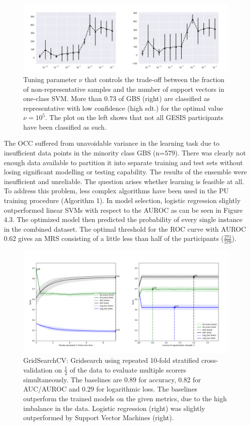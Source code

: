 \begin{figure}[ht]
\centering
   \includegraphics[scale=0.38,angle=0]{fig/occfigure}
\captionsetup{width= 380pt}
\caption{Tuning parameter \(\nu\) that controls the trade-off between the fraction of non-representative samples and the number of support vectors in one-class SVM. More than 0.73 of GBS (right) are classified as representative with low confidence (high sdt.) for the optimal value \( \nu = 10^5\). The plot on the left shows that not all GESIS participants have been classified as such.} 
\end{figure}

The OCC suffered from unavoidable variance in the learning task due to insufficient data points in the minority class GBS (n=579). There was clearly not enough data available to partition it into separate training and test sets without losing significant modelling or testing capability. The results of the ensemble were insufficient and unreliable. The question arises whether learning is feasible at all. To address this problem, less complex algorithms have been used in the PU training procedure (Algorithm 1). In model selection, logistic regression slightly outperformed linear SVMs with respect to the AUROC as can be seen in Figure 4.3. The optimized model then predicted the probability of every single instance in the combined dataset. The optimal threshold for the ROC curve with AUROC 0.62 gives an MRS consisting of a little less than half of the participants (\(\frac{271}{579}\)).

\begin{figure}[ht]
\centering
   \includegraphics[scale=0.38,angle=0]{fig/gridfigure}
\captionsetup{width= 400pt}
\caption{GridSearchCV: Gridsearch using repeated 10-fold stratified cross-validation on \(\frac{1}{2}\) of the data to evaluate multiple scorers simultaneously. The baselines are 0.89 for accuracy, 0.82 for AUC/AUROC and 0.29 for logarithmic loss. The baselines outperform the trained models on the given metrics, due to the high imbalance in the data. Logistic regression (right) was slightly outperformed by Support Vector Machines (right).}
   \label{fig:Ng1} 
\end{figure}

